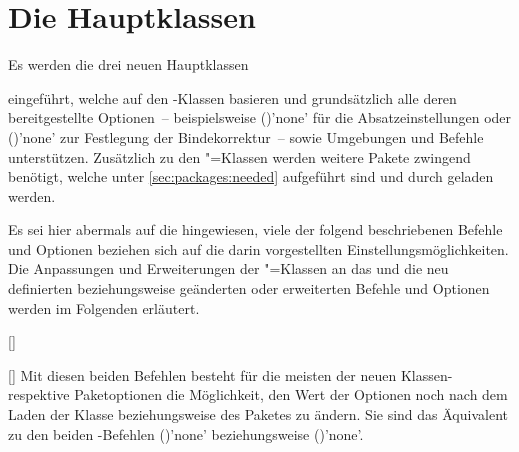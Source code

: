 \chapter[%
  Die Hauptklassen \Class*{tudscrbook}, \Class*{tudscrreprt} und 
  \Class*{tudscrartcl}%
]{Die Hauptklassen}
%
%
%
\begin{Declaration*}{}
\begin{Declaration*}{}
\begin{Declaration*}{}
Es werden die drei neuen Hauptklassen
%
\begin{description}
\item {}
\item {}
\item {}
\end{description}
%
eingeführt, welche auf den \KOMAScript-Klassen basieren und grundsätzlich alle 
deren bereitgestellte Optionen~-- beispielsweise 
()'none' für die 
Absatzeinstellungen oder 
()'none' zur Festlegung der 
Bindekorrektur~-- sowie Umgebungen und Befehle unterstützen. Zusätzlich zu den 
\KOMAScript"=Klassen werden weitere Pakete zwingend benötigt, welche unter 
\autoref{sec:packages:needed} aufgeführt sind und durch \TUDScript geladen 
werden.

Es sei hier abermals auf die  
hingewiesen, viele der folgend beschriebenen Befehle und Optionen beziehen sich 
auf die darin vorgestellten Einstellungsmöglichkeiten. Die Anpassungen und 
Erweiterungen der \KOMAScript"=Klassen an das \CD und die neu definierten 
beziehungsweise geänderten oder erweiterten Befehle und Optionen werden im 
Folgenden erläutert.

\begin{Declaration}{[]}
\begin{Declaration}{[]}
\printdeclarationlist%
%
%
Mit diesen beiden Befehlen besteht für die meisten der neuen Klassen- respektive
Paketoptionen die Möglichkeit, den Wert der Optionen noch nach dem Laden der 
Klasse beziehungsweise des Paketes zu ändern. Sie sind das Äquivalent zu den 
beiden \KOMAScript-Befehlen ()'none' 
beziehungsweise ()'none'.


\end{Declaration}
\end{Declaration}
\end{Declaration*}
\end{Declaration*}
\end{Declaration*}

